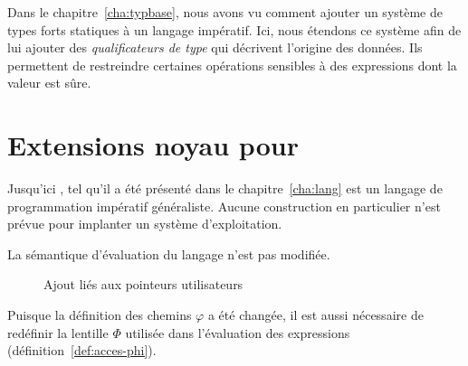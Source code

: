 Dans le chapitre~\ref{cha:typbase}, nous avons vu comment ajouter un système de
types forts statiques à un langage impératif. Ici, nous étendons ce système afin
de lui ajouter des \emph{qualificateurs de type} qui décrivent l'origine des
données. Ils permettent de restreindre certaines opérations sensibles à des
expressions dont la valeur est sûre.

\section{Extensions noyau pour \langname}

Jusqu'ici \langname, tel qu'il a été présenté dans le chapitre~\ref{cha:lang}
est un langage de programmation impératif généraliste. Aucune construction en
particulier n'est prévue pour implanter un système d'exploitation.

La sémantique d'évaluation du langage n'est pas modifiée.



\begin{figure}





\caption{Ajout liés aux pointeurs utilisateurs}
\label{fig:qualif-changes}

\end{figure}

Puisque la définition des chemins $φ$ a été changée, il est aussi nécessaire de
redéfinir la lentille $Φ$ utilisée dans l'évaluation des expressions
(définition~\ref{def:acces-phi}).

